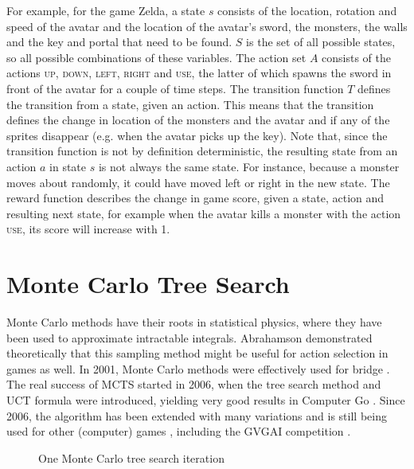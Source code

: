 For example, for the game Zelda, a state $s$ consists of the location, rotation
and speed of the avatar and the location of the avatar's sword, the monsters, the
walls and the key and portal that need to be found. $S$ is the set of all
possible states, so all possible combinations of these variables. The action set
$A$ consists of the actions \textsc{up}, \textsc{down}, \textsc{left},
\textsc{right} and \textsc{use}, the latter of which spawns the sword in front
of the avatar for a couple of time steps. The transition function $T$ defines the
transition from a state, given an action.  This means that the transition
defines the change in location of the monsters and the avatar and if any of the
sprites disappear (e.g. when the avatar picks up the key). Note that, since
the transition function is not by definition deterministic, the resulting state
from an action $a$ in state $s$ is not always the same state. For instance,
because a monster moves about randomly, it could have moved left or right in the
new state. The reward function describes the change in game score, given a
state, action and resulting next state, for example when the avatar kills a
monster with the action \textsc{use}, its score will increase with 1.

\section{Monte Carlo Tree Search}
\label{subsec:mcts}
Monte Carlo methods have their roots in statistical physics, where they have
been used to approximate intractable integrals. Abrahamson
\cite{abramson1990expected} demonstrated theoretically that this sampling method
might be useful for action selection in games as well.  In 2001, Monte Carlo
methods were effectively used for bridge \cite{ginsberg2001gib}. The real
success of MCTS started in 2006, when the tree search method and UCT formula
were introduced, yielding very good results in Computer Go
\cite{gelly2006modification}. Since 2006, the algorithm has been extended with
many variations and is still being used for other (computer) games
\cite{browne2012survey}, including the GVGAI competition
\cite{perez2014knowledge}.

\begin{figure}
	\centering
	\caption{One Monte Carlo tree search iteration}
	\label{fig:mcts}
\end{figure}

